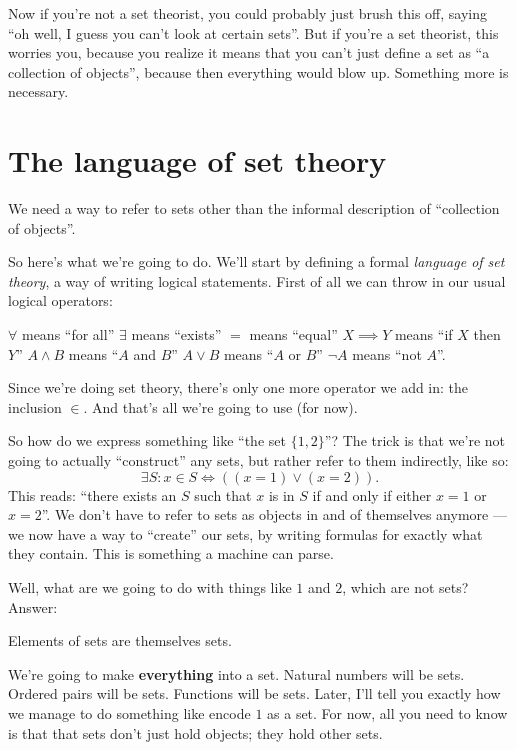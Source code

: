 Now if you're not a set theorist, you could probably just brush this off,
saying ``oh well, I guess you can't look at certain sets''.
But if you're a set theorist, this worries you,
because you realize it means that you can't
just define a set as ``a collection of objects'',
because then everything would blow up.
Something more is necessary.

\section{The language of set theory}
We need a way to refer to sets other
than the informal description of ``collection of objects''.

So here's what we're going to do.
We'll start by defining a formal \emph{language of set theory},
a way of writing logical statements.
First of all we can throw in our usual logical operators:
\begin{itemize}
	\ii $\forall$ means ``for all''
	\ii $\exists$ means ``exists''
	\ii $=$ means ``equal''
	\ii $X \implies Y$ means ``if $X$ then $Y$''
	\ii $A \land B$ means ``$A$ and $B$''
	\ii $A \lor B$ means ``$A$ or $B$''
	\ii $\neg A$ means ``not $A$''.
\end{itemize}

Since we're doing set theory,
there's only one more operator we add in: the inclusion $\in$.
And that's all we're going to use (for now).

So how do we express something like ``the set $\{1, 2\}$''?
The trick is that we're not going to actually ``construct'' any sets,
but rather refer to them indirectly, like so:
\[ \exists S : x \in S \iff \left( (x=1) \lor (x=2) \right). \]
This reads: ``there exists an $S$ such that $x$ is in $S$ if
and only if either $x=1$ or $x=2$''.
We don't have to refer to sets as objects in and of
themselves anymore --- we now have a way to ``create'' our sets,
by writing formulas for exactly what they contain.
This is something a machine can parse.

Well, what are we going to do with things like $1$ and $2$, which are not sets?
Answer:
\begin{moral}
	Elements of sets are themselves sets.
\end{moral}
We're going to make \textbf{everything} into a set.
Natural numbers will be sets. Ordered pairs will be sets. Functions will be sets.
Later, I'll tell you exactly how we manage to do something like encode $1$ as a set.
For now, all you need to know is that that sets don't just hold objects;
they hold other sets.

